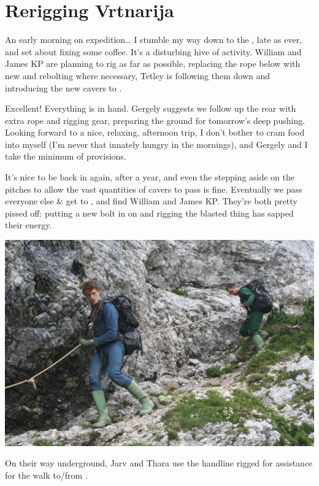 \section{Rerigging Vrtnarija}



An early morning on expedition\ldots{} I stumble my way down to the
, late as ever, and set about fixing some coffee. It's a disturbing
hive of activity. William and James KP are planning to rig as far as
possible, replacing the rope below  with new and rebolting
where necessary, Tetley is following them down and introducing the new
cavers to .

Excellent! Everything is in hand. Gergely suggests we follow up the rear
with extra rope and rigging gear, preparing the ground for tomorrow's
deep pushing. Looking forward to a nice, relaxing, afternoon trip, I
don't bother to cram food into myself (I'm never that innately hungry in
the mornings), and Gergely and I take the minimum of provisions.

It's nice to be back in  again, after a year, and even
the stepping aside on the pitches to allow the vast quantities of cavers
to pass is fine. Eventually we pass everyone else \& get to , and
find William and James KP. They're both pretty pissed off: putting a new
bolt in on  and rigging the blasted thing has sapped their energy.


\begin{pagefigure}
\checkoddpage \ifoddpage \forcerectofloat \else \forceversofloat \fi
   \centering
\includegraphics[width = \textwidth]{2010/expo_stories/20100810-11-17-37 - Jana Carga 35--orig.jpg}
\caption{On their way underground, Jarv and Thara use the handline rigged for assistance for the walk to/from \protect{}. } \label{handline to GW}
\end{pagefigure}


